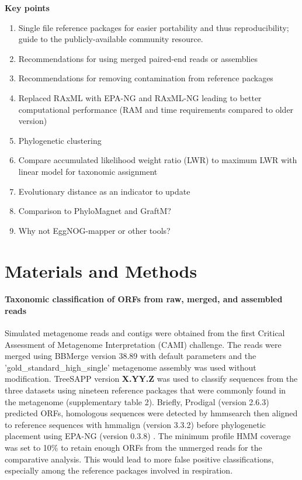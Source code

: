 \documentclass[10pt,letterpaper]{article}
\begin{document}
\textbf{Key points}
\begin{enumerate}
\item Single file reference packages for easier portability and thus reproducibility; guide to the publicly-available community resource.
\item Recommendations for using merged paired-end reads or assemblies
\item Recommendations for removing contamination from reference packages
\item Replaced RAxML with EPA-NG and RAxML-NG leading to better computational performance (RAM and time requirements compared to older version)
\item Phylogenetic clustering
\item Compare accumulated likelihood weight ratio (LWR) to maximum LWR with linear model for taxonomic assignment
\item Evolutionary distance as an indicator to update
\item Comparison to PhyloMagnet and GraftM?
\item Why not EggNOG-mapper or other tools?
\end{enumerate}

\section*{Materials and Methods}

\paragraph{Taxonomic classification of ORFs from raw, merged, and assembled reads}

Simulated metagenome reads and contigs were obtained from the first Critical Assessment of Metagenome Interpretation (CAMI) challenge\cite{}. The reads were merged using BBMerge version 38.89 with default parameters and the 'gold\_standard\_high\_single' metagenome assembly was used without modification. TreeSAPP version \textbf{X.YY.Z} was used to classify sequences from the three datasets using nineteen reference packages that were commonly found in the metagenome (supplementary table 2). Briefly, Prodigal (version 2.6.3) predicted ORFs, homologous sequences were detected by hmmsearch then aligned to reference sequences with hmmalign (version 3.3.2) before phylogenetic placement using EPA-NG (version 0.3.8) \cite{}. The minimum profile HMM coverage was set to 10\% to retain enough ORFs from the unmerged reads for the comparative analysis. This would lead to more false positive classifications, especially among the reference packages involved in respiration.
\end{document}
